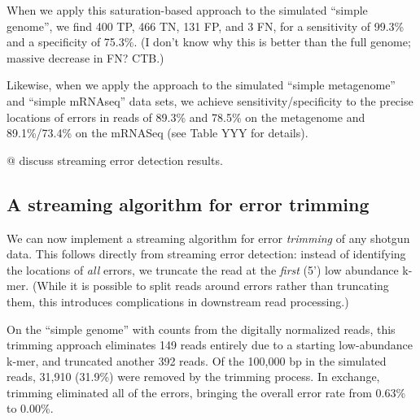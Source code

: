 

When we apply this saturation-based approach to the simulated ``simple
genome'', we find 400 TP, 466 TN, 131 FP, and 3 FN, for a sensitivity
of 99.3\% and a specificity of 75.3\%.  (I don't know why this is better
than the full genome; massive decrease in FN? CTB.)



Likewise, when we apply the approach to the simulated ``simple
metagenome'' and ``simple mRNAseq'' data sets, we achieve
sensitivity/specificity to the precise locations of errors in reads of
89.3\% and 78.5\% on the metagenome and 89.1\%/73.4\% on the mRNASeq
(see Table YYY for details).

@ discuss streaming error detection results.

\subsection{A streaming algorithm for error trimming}

We can now implement a streaming algorithm for error {\em trimming} of
any shotgun data.  This follows directly from streaming error
detection: instead of identifying the locations of {\em all} errors,
we truncate the read at the {\em first} (5') low abundance k-mer.
(While it is possible to split reads around errors rather than
truncating them, this introduces complications in downstream read
processing.)

On the ``simple genome'' with counts from the digitally normalized reads,
this trimming approach eliminates 149 reads entirely due to a starting
low-abundance k-mer, and truncated another 392 reads.  Of the 100,000
bp in the simulated reads, 31,910 (31.9\%) were removed by the
trimming process.  In exchange, trimming eliminated all of the errors,
bringing the overall error rate from 0.63\% to 0.00\%.

